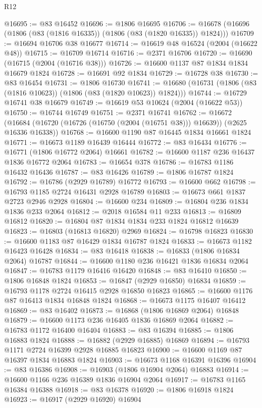 \begin{lexlean}{R12}
\begin{coremodule}
@16695 := @83 @16452
@16696 := @1806 @16695
@16706 := @16678 (@16696 (@1806 (@83 (@1816 @16335)) (@1806 (@83 (@1820 @16335)) @1824)))
@16709 := @16694 @16706 @38 @16677
@16714 := @16619 @48 @16524 (@2004 (@16622 @48))
@16715 := @16709 @16714
@16716 := @2371 @16706
@16720 := @16690 (@16715 (@2004 (@16716 @38)))
@16726 := @16600 @1137 @87 @1834 @1834 @16679 @1824
@16728 := @16691 @92 @1834
@16729 := @16728 @38
@16730 := @83 @16454
@16731 := @1806 @16730
@16741 := @16680 (@16731 (@1806 (@83 (@1816 @10623)) (@1806 (@83 (@1820 @10623)) @1824)))
@16744 := @16729 @16741 @38 @16679
@16749 := @16619 @53 @10624 (@2004 (@16622 @53))
@16750 := @16744 @16749
@16751 := @2371 @16741
@16762 := @16672
    (@16684 (@16720 (@16726 (@16750 (@2004 (@16751 @38))) @16639)) (@2625 @16336 @16338))
@16768 := @16600 @1190 @87 @16445 @1834 @16661 @1824
@16771 := @16673 @1189 @16439 @16444
@16772 := @83 @16434
@16776 := @16771 (@1806 @16772 @2064) @16661
@16782 := @16600 @1187 @236 @16437 @1836 @16772 @2064
@16783 := @16654 @378
@16786 := @16783 @1186 @16432 @16436
@16787 := @83 @16426
@16789 := @1806 @16787 @1824
@16792 := @16786 (@2929 @16789) @16772
@16793 := @16600 @662
@16798 := @16793 @1185 @2724 @16431 @2928 @16789
@16803 := @16673 @661 @1837 @2723 @2946 @2928
@16804 := @16600 @234
@16809 := @16804 @236 @1834 @1836 @233 @2064
@16812 := @2018 @16584 @11 @233
@16813 := @16809 @16812
@16820 := @16804 @87 @1834 @1834 @233 @1824 @16812 @16639
@16823 := @16803 (@16813 @16820) @2969
@16824 := @16798 @16823
@16830 := @16600 @1183 @87 @16429 @1834 @16787 @1824
@16833 := @16673 @1182 @16423 @16428
@16834 := @83 @16418
@16838 := @16833 (@1806 @16834 @2064) @16787
@16844 := @16600 @1180 @236 @16421 @1836 @16834 @2064
@16847 := @16783 @1179 @16416 @16420
@16848 := @83 @16410
@16850 := @1806 @16848 @1824
@16853 := @16847 (@2929 @16850) @16834
@16859 := @16793 @1178 @2724 @16415 @2928 @16850 @16823
@16865 := @16600 @1176 @87 @16413 @1834 @16848 @1824
@16868 := @16673 @1175 @16407 @16412
@16869 := @83 @16402
@16873 := @16868 (@1806 @16869 @2064) @16848
@16879 := @16600 @1173 @236 @16405 @1836 @16869 @2064
@16882 := @16783 @1172 @16400 @16404
@16883 := @83 @16394
@16885 := @1806 @16883 @1824
@16888 := @16882 (@2929 @16885) @16869
@16894 := @16793 @1171 @2724 @16399 @2928 @16885 @16823
@16900 := @16600 @1169 @87 @16397 @1834 @16883 @1824
@16903 := @16673 @1168 @16391 @16396
@16904 := @83 @16386
@16908 := @16903 (@1806 @16904 @2064) @16883
@16914 := @16600 @1166 @236 @16389 @1836 @16904 @2064
@16917 := @16783 @1165 @16384 @16388
@16918 := @83 @16378
@16920 := @1806 @16918 @1824
@16923 := @16917 (@2929 @16920) @16904

\end{coremodule}
\end{lexlean}
